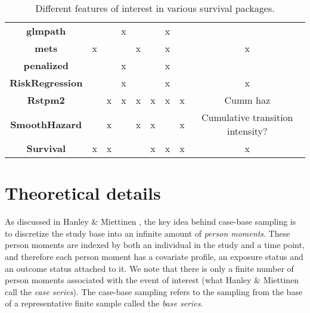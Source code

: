 \documentclass[
]{jss}
\begin{document}
\begin{table}[]
{\begin{tabular}{ccccccccc}
\textbf{glmpath}        &                          &                           & x                     &                  &                     & x                        &                                  &                                  \\
\textbf{mets}           & x                        &                           &                       & x                &                     & x                        &                                  & x                                \\
\textbf{penalized}      &                          &                           & x                     &                  &                     & x                        &                                  &                                  \\
\textbf{RiskRegression} &                          &                           & x                     &                  &                     & x                        &                                  & x                                \\
\textbf{Rstpm2}         &                          & x                         & x                     & x                & x                   & x                        & x                                & Cumm haz                         \\
\textbf{SmoothHazard}   &                          & x                         &                       & x                & x                   &                          & x                                & Cumulative transition intensity? \\
\textbf{Survival}       & x                        & x                         &                       &                  & x                   & x                        & x                                & x                               
\end{tabular}%
}
\caption{Different features of interest in various survival packages.}
\label{tab:my-table}
\end{table}

\hypertarget{theoretical-details}{%
\section{Theoretical details}\label{theoretical-details}}

As discussed in Hanley \& Miettinen \citeyearpar{hanley2009fitting}, the
key idea behind case-base sampling is to discretize the study base into
an infinite amount of \emph{person moments}. These person moments are
indexed by both an individual in the study and a time point, and
therefore each person moment has a covariate profile, an exposure status
and an outcome status attached to it. We note that there is only a
finite number of person moments associated with the event of interest
(what Hanley \& Miettinen call the \emph{case series}). The case-base
sampling refers to the sampling from the base of a representative finite
sample called the \emph{base series}.
\end{document}
